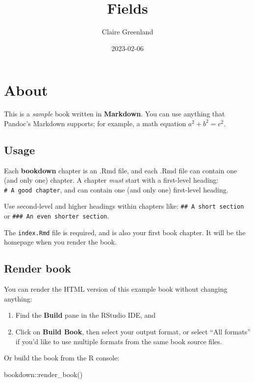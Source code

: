 \documentclass[
]{book}
\title{Fields}
\author{Claire Greenland}
\date{2023-02-06}
\newenvironment{Shaded}{\begin{snugshade}}{\end{snugshade}}
\newcommand{\FunctionTok}[1]{\textcolor[rgb]{0.00,0.00,0.00}{#1}}
\newcommand{\NormalTok}[1]{#1}
\newcommand{\SpecialCharTok}[1]{\textcolor[rgb]{0.00,0.00,0.00}{#1}}
\theoremstyle{definition}
\theoremstyle{definition}
\theoremstyle{definition}
\theoremstyle{definition}
\theoremstyle{remark}
\begin{document}
\maketitle

{
\setcounter{tocdepth}{1}
\tableofcontents
}
\hypertarget{about}{%
\chapter{About}\label{about}}

This is a \emph{sample} book written in \textbf{Markdown}. You can use anything that Pandoc's Markdown supports; for example, a math equation \(a^2 + b^2 = c^2\).

\hypertarget{usage}{%
\section{Usage}\label{usage}}

Each \textbf{bookdown} chapter is an .Rmd file, and each .Rmd file can contain one (and only one) chapter. A chapter \emph{must} start with a first-level heading: \texttt{\#\ A\ good\ chapter}, and can contain one (and only one) first-level heading.

Use second-level and higher headings within chapters like: \texttt{\#\#\ A\ short\ section} or \texttt{\#\#\#\ An\ even\ shorter\ section}.

The \texttt{index.Rmd} file is required, and is also your first book chapter. It will be the homepage when you render the book.

\hypertarget{render-book}{%
\section{Render book}\label{render-book}}

You can render the HTML version of this example book without changing anything:

\begin{enumerate}
\def\labelenumi{\arabic{enumi}.}
\item
  Find the \textbf{Build} pane in the RStudio IDE, and
\item
  Click on \textbf{Build Book}, then select your output format, or select ``All formats'' if you'd like to use multiple formats from the same book source files.
\end{enumerate}

Or build the book from the R console:

\begin{Shaded}
\begin{Highlighting}[]
\NormalTok{bookdown}\SpecialCharTok{::}\FunctionTok{render\_book}\NormalTok{()}
\end{Highlighting}
\end{Shaded}
\end{document}
